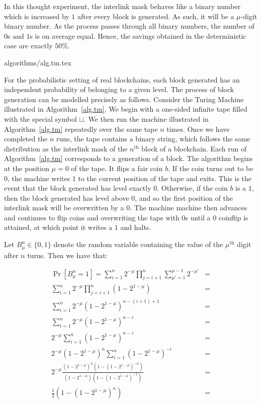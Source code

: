 In this thought experiment, the interlink mask behaves like a binary number
which is increased by $1$ after every block is generated. As such, it will be a
$\mu$-digit binary number. As the process passes through all binary numbers, the
number of $0$s and $1$s is on average equal. Hence, the savings obtained in the
deterministic case are exactly $50\%$.

{algorithms/alg.tm.tex}

For the probabilistic setting of real blockchains, each block generated has an
independent probability of belonging to a given level. The process of block
generation can be modelled precisely as follows. Consider the Turing Machine
illustrated in Algorithm~\ref{alg.tm}. We begin with a one-sided infinite
tape filled with the special symbol $\sqcup$. We then run the machine
illustrated in Algorithm~\ref{alg.tm} repeatedly over the same tape $n$ times.
Once we have completed the $n$ runs, the tape contains a binary string, which
follows the same distribution as the interlink mask of the $n^\text{th}$ block
of a blockchain. Each run of Algorithm~\ref{alg.tm} corresponds to a generation
of a block. The algorithm begins at the position $\mu = 0$ of the tape. It flips
a fair coin $b$. If the coin turns out to be $0$, the machine writes $1$ to the
current position of the tape and exits. This is the event that the block
generated has level exactly $0$. Otherwise, if the coin $b$ is a $1$, then the
block generated has level above $0$, and so the first position of the interlink
mask will be overwritten by a $0$. The machine machine then advances and
continues to flip coins and overwriting the tape with $0$s until a $0$ coinflip
is attained, at which point it writes a $1$ and halts.

Let $B^n_\mu \in \{0, 1\}$ denote the random variable containing the value of
the $\mu^{\text{th}}$ digit after $n$ turns. Then we have that:

\begin{align*}
\Pr[B^n_\mu = 1] =
\sum_{i = 1}^n 2^{-\mu} \prod_{j = i + 1}^n \sum_{\mu' = 1}^{\mu - 1} 2^{-\mu'} &=\\
\sum_{i = 1}^n 2^{-\mu} \prod_{j = i + 1}^n (1 - 2^{1 - \mu}) &=\\
\sum_{i = 1}^n 2^{-\mu} (1 - 2^{1 -\mu})^{n - (i + 1) + 1} &=\\
\sum_{i = 1}^n 2^{-\mu} (1 - 2^{1 -\mu})^{n - i} &=\\
2^{-\mu} \sum_{i = 1}^n (1 - 2^{1 -\mu})^{n - i} &=\\
2^{-\mu} (1 - 2^{1 - \mu})^n \sum_{i = 1}^n (1 - 2^{1 -\mu})^{-i} &=\\
2^{-\mu} \frac{(1 - 2^{1 - \mu})^n (1 - (1 - 2^{1-\mu})^{-n})}{(1 - 2^{1 - \mu})(1 - (1 - 2^{1 - \mu})^{-1})} &=\\
\frac{1}{2} (1 - (1 - 2^{1 - \mu})^n) &=\\
\end{align*}

